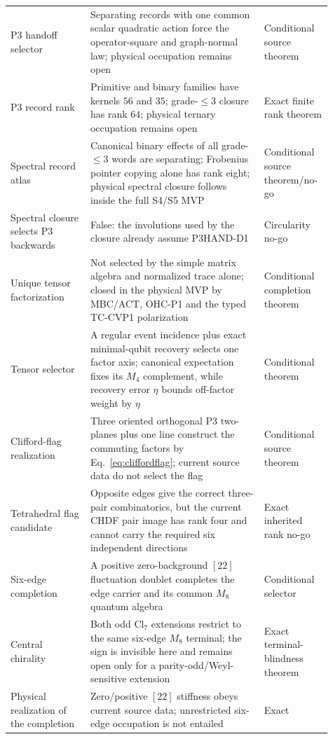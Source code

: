 \documentclass[11pt]{article}
\begin{document}
\begin{longtable}{@{}>{\raggedright\arraybackslash}p{0.23\linewidth}>{\raggedright\arraybackslash}p{0.50\linewidth}>{\raggedright\arraybackslash}p{0.18\linewidth}@{}}
P3 handoff selector & Separating records with one common scalar quadratic
action force the operator-square and graph-normal law; physical occupation
remains open & Conditional source theorem \\
P3 record rank & Primitive and binary families have kernels $56$ and $35$;
grade-$\leq3$ closure has rank $64$; physical ternary occupation remains open
& Exact finite rank theorem \\
Spectral record atlas & Canonical binary effects of all grade-$\leq3$ words
are separating; Frobenius pointer copying alone has rank eight; physical
spectral closure follows inside the full S4/S5 MVP & Conditional source
theorem/no-go \\
Spectral closure selects P3 backwards & False: the involutions used by the
closure already assume P3HAND-D1 & Circularity no-go \\
Unique tensor factorization & Not selected by the simple matrix algebra and
normalized trace alone; closed in the physical MVP by MBC/ACT, OHC-P1 and the
typed TC-CVP1 polarization & Conditional completion theorem \\
Tensor selector & A regular event incidence plus exact minimal-qubit recovery
selects one factor axis; canonical expectation fixes its $M_4$ complement,
while recovery error $\eta$ bounds off-factor weight by $\eta$ & Conditional
theorem \\
Clifford-flag realization & Three oriented orthogonal P3 two-planes plus one
line construct the commuting factors by Eq.~\eqref{eq:cliffordflag}; current
source data do not select the flag & Conditional source theorem \\
Tetrahedral flag candidate & Opposite edges give the correct three-pair
combinatorics, but the current CHDF pair image has rank four and cannot carry
the required six independent directions & Exact inherited rank no-go \\
Six-edge completion & A positive zero-background $[22]$ fluctuation doublet
completes the edge carrier and its common $M_8$ quantum algebra & Conditional
selector \\
Central chirality & Both odd $\mathrm{Cl}_7$ extensions restrict to the same
six-edge $M_8$ terminal; the sign is invisible here and remains open only for
a parity-odd/Weyl-sensitive extension & Exact terminal-blindness theorem \\
Physical realization of the completion & Zero/positive $[22]$ stiffness obeys
current source data; unrestricted six-edge occupation is not entailed & Exact

\end{longtable}
\end{document}
